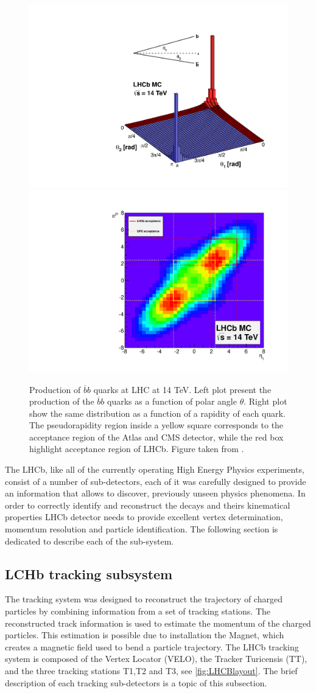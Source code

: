 \begin{figure}[h]
 \begin{center}
  \includegraphics[width=0.40\linewidth]{figures/bb_1.pdf}
   \includegraphics[width=0.35\linewidth,angle=270]{figures/bb_2.pdf}
   \caption{Production of  $\overline{b}b$ quarks at LHC at 14 TeV. Left plot present the production of the $\overline{b}b$ quarks as a function of polar angle $\theta$. Right plot show the same distribution as a function of a rapidity of each quark. The pseudorapidity region inside a yellow square corresponds to the acceptance region of the Atlas and CMS detector, while the red box highlight acceptance region of LHCb. Figure taken from \cite{bbangles}. 
     \label{fig:bb}}
 \end{center}
\end{figure}

The LHCb, like all of the currently operating High Energy Physics experiments, consist of a number of sub-detectors, each of it was carefully designed to provide an information that allows to discover, previously unseen physics phenomena. In order to correctly identify and reconstruct the decays and theirs kinematical properties LHCb detector needs to provide excellent vertex determination, momentum resolution and particle identification. The following section is dedicated to describe each of the sub-system. 

\subsection{LCHb tracking subsystem}
\label{sec:lhcb_tracking_subsystem}
The tracking system was designed to reconstruct the trajectory of charged particles by combining information from a set of tracking stations. The reconstructed track information is used to estimate the momentum of the charged particles. This estimation is possible due to installation the Magnet, which creates a magnetic field used to bend a particle trajectory. The LHCb tracking system is composed of the Vertex Locator (VELO), the Tracker Turicensis (TT), and the three tracking stations T1,T2 and T3, see \ref{fig:LHCBlayout}.  The brief description of each tracking sub-detectors is a topic of this subsection. 

